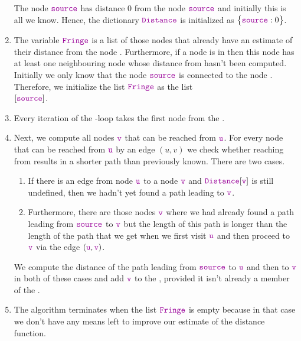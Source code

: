 \begin{enumerate}
      The node $\mytt{source}$ has distance $0$ from the node $\mytt{source}$ and initially this is
      all we know.  Hence, the dictionary $\mytt{Distance}$ is initialized as $\bigl\{\mytt{source}:0 \bigr\}$.
\item The variable $\mytt{Fringe}$ is a list of those nodes that already have an estimate of
      their distance from the  node .  Furthermore, if a node is in  then this
      node has at least one neighbouring node whose distance from  hasn't been computed. 
      Initially we only know that the node $\mytt{source}$ is connected to the node .
      Therefore, we initialize the list $\mytt{Fringe}$ as the list
      \\[0.2cm]
      \hspace*{1.3cm}
      $[ \mytt{source} ]$.
\item Every iteration of the -loop takes the first node  from the .
\item Next, we compute all nodes $\mytt{v}$ that can be reached from $\mytt{u}$. For every node 
      that can be reached from $\mytt{u}$ by an edge $(u, v)$ we check whether 
      reaching  from  results in a shorter path than previously known.
      There are two cases.
      \begin{enumerate}
      \item If there is an edge from node $\mytt{u}$ to a node $\mytt{v}$ and  $\mytt{Distance}[\mytt{v}]$ is still
            undefined, then we hadn't yet found a path leading to $\mytt{v}$.
      \item Furthermore, there are those nodes $\mytt{v}$ where we had already found a path leading from
            $\mytt{source}$ to $\mytt{v}$ but the length of this path is longer than the length of the path
            that we get when we first visit $\mytt{u}$ and then proceed to $\mytt{v}$ via the edge $(\mytt{u},\mytt{v})$.
      \end{enumerate}
      We compute the distance of the path leading from $\mytt{source}$ to $\mytt{u}$ and then to
      $\mytt{v}$ in both of these cases and add $\mytt{v}$ to the , provided it isn't
      already a member of the .
\item The algorithm terminates when the list $\mytt{Fringe}$ is empty because in that case we don't
      have any means left to improve our estimate of the distance function.
\end{enumerate}

